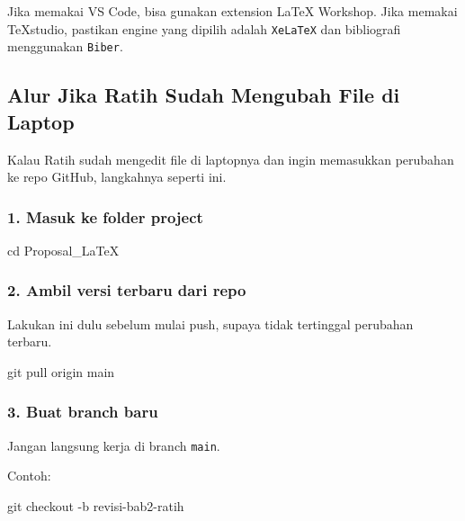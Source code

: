 \documentclass[
]{article}
\newenvironment{Shaded}{}{}
\newcommand{\AttributeTok}[1]{\textcolor[rgb]{0.49,0.56,0.16}{#1}}
\newcommand{\BuiltInTok}[1]{\textcolor[rgb]{0.00,0.50,0.00}{#1}}
\newcommand{\FunctionTok}[1]{\textcolor[rgb]{0.02,0.16,0.49}{#1}}
\newcommand{\NormalTok}[1]{#1}
\begin{document}
Jika memakai VS Code, bisa gunakan extension LaTeX Workshop. Jika
memakai TeXstudio, pastikan engine yang dipilih adalah \texttt{XeLaTeX}
dan bibliografi menggunakan \texttt{Biber}.

\subsection{Alur Jika Ratih Sudah Mengubah File di
Laptop}\label{alur-jika-ratih-sudah-mengubah-file-di-laptop}

Kalau Ratih sudah mengedit file di laptopnya dan ingin memasukkan
perubahan ke repo GitHub, langkahnya seperti ini.

\subsubsection{1. Masuk ke folder
project}\label{masuk-ke-folder-project}

\begin{Shaded}
\begin{Highlighting}[]
\BuiltInTok{cd}\NormalTok{ Proposal\_LaTeX}
\end{Highlighting}
\end{Shaded}

\subsubsection{2. Ambil versi terbaru dari
repo}\label{ambil-versi-terbaru-dari-repo}

Lakukan ini dulu sebelum mulai push, supaya tidak tertinggal perubahan
terbaru.

\begin{Shaded}
\begin{Highlighting}[]
\FunctionTok{git}\NormalTok{ pull origin main}
\end{Highlighting}
\end{Shaded}

\subsubsection{3. Buat branch baru}\label{buat-branch-baru}

Jangan langsung kerja di branch \texttt{main}.

Contoh:

\begin{Shaded}
\begin{Highlighting}[]
\FunctionTok{git}\NormalTok{ checkout }\AttributeTok{{-}b}\NormalTok{ revisi{-}bab2{-}ratih}
\end{Highlighting}
\end{Shaded}
\end{document}
